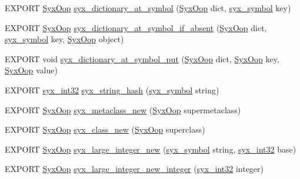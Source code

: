 \begin{CompactItemize}
EXPORT \hyperlink{syx-types_8h_1121caba2d40b2ce090b640762744ccd}{SyxOop} \hyperlink{syx-object_8h_b4f98861384da9ef7ae4017b0639e2ab}{syx\_\-dictionary\_\-at\_\-symbol} (\hyperlink{syx-types_8h_1121caba2d40b2ce090b640762744ccd}{SyxOop} dict, \hyperlink{syx-types_8h_9663af54b7b72f5d8be5f754ef356525}{syx\_\-symbol} key)
\item 
EXPORT \hyperlink{syx-types_8h_1121caba2d40b2ce090b640762744ccd}{SyxOop} \hyperlink{syx-object_8h_6a48a39293c1dd5141d431f1ee8a8f7a}{syx\_\-dictionary\_\-at\_\-symbol\_\-if\_\-absent} (\hyperlink{syx-types_8h_1121caba2d40b2ce090b640762744ccd}{SyxOop} dict, \hyperlink{syx-types_8h_9663af54b7b72f5d8be5f754ef356525}{syx\_\-symbol} key, \hyperlink{syx-types_8h_1121caba2d40b2ce090b640762744ccd}{SyxOop} object)
\item 
EXPORT void \hyperlink{syx-object_8h_1a46d03f5dad054ace2cc9bbe258f62e}{syx\_\-dictionary\_\-at\_\-symbol\_\-put} (\hyperlink{syx-types_8h_1121caba2d40b2ce090b640762744ccd}{SyxOop} dict, \hyperlink{syx-types_8h_1121caba2d40b2ce090b640762744ccd}{SyxOop} key, \hyperlink{syx-types_8h_1121caba2d40b2ce090b640762744ccd}{SyxOop} value)
\item 
EXPORT \hyperlink{syx-types_8h_9f31c17555a2dfcf25da84b5c4a2e55b}{syx\_\-int32} \hyperlink{syx-object_8h_20b65111a07600b8b06a64a6f473daab}{syx\_\-string\_\-hash} (\hyperlink{syx-types_8h_9663af54b7b72f5d8be5f754ef356525}{syx\_\-symbol} string)
\item 
EXPORT \hyperlink{syx-types_8h_1121caba2d40b2ce090b640762744ccd}{SyxOop} \hyperlink{syx-object_8h_0c0151b9f4207e6e2d38c4eba9370d9d}{syx\_\-metaclass\_\-new} (\hyperlink{syx-types_8h_1121caba2d40b2ce090b640762744ccd}{SyxOop} supermetaclass)
\item 
EXPORT \hyperlink{syx-types_8h_1121caba2d40b2ce090b640762744ccd}{SyxOop} \hyperlink{syx-object_8h_15348943e9bdd2ca68f7c4aeee628c9a}{syx\_\-class\_\-new} (\hyperlink{syx-types_8h_1121caba2d40b2ce090b640762744ccd}{SyxOop} superclass)
\item 
EXPORT \hyperlink{syx-types_8h_1121caba2d40b2ce090b640762744ccd}{SyxOop} \hyperlink{syx-object_8h_6e4566798088986aa8af7c776a00b90b}{syx\_\-large\_\-integer\_\-new} (\hyperlink{syx-types_8h_9663af54b7b72f5d8be5f754ef356525}{syx\_\-symbol} string, \hyperlink{syx-types_8h_9f31c17555a2dfcf25da84b5c4a2e55b}{syx\_\-int32} base)
\item 
EXPORT \hyperlink{syx-types_8h_1121caba2d40b2ce090b640762744ccd}{SyxOop} \hyperlink{syx-object_8h_72fbd99412e7332f70d9a5a15945a33d}{syx\_\-large\_\-integer\_\-new\_\-integer} (\hyperlink{syx-types_8h_9f31c17555a2dfcf25da84b5c4a2e55b}{syx\_\-int32} integer)

\end{CompactItemize}
